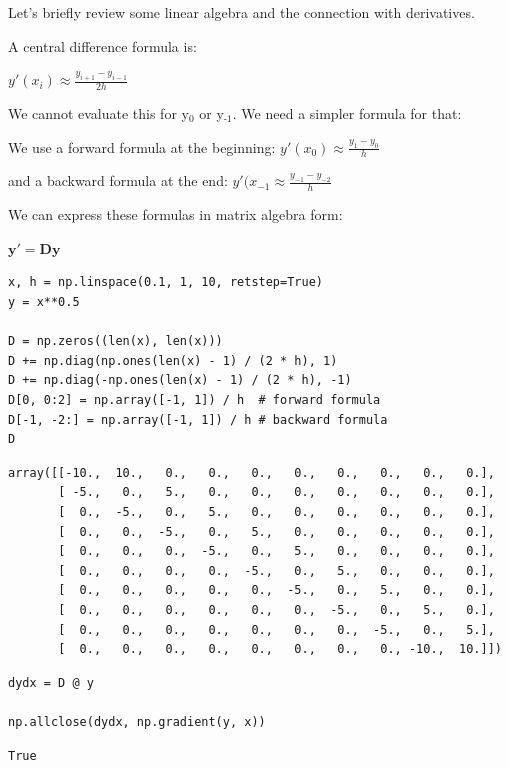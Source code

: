 \documentclass[11pt]{article}
\begin{document}
Let's briefly review some linear algebra and the connection with derivatives.

A central difference formula is:

\(y'(x_i) \approx \frac{y_{i+1} - y_{i-1}}{2h}\)

We cannot evaluate this for y\(_{\text{0}}\) or y\(_{\text{-1}}\). We need a simpler formula for that:

We use a forward formula at the beginning: \(y'(x_0) \approx \frac{y_1 - y_0}{h}\)

and a backward formula at the end:  \(y'(x_{-1} \approx \frac{y_{-1} - y_{-2}}{h}\)

We can express these formulas in matrix algebra form:

\(\mathbf{y'} = \mathbf{D} \mathbf{y}\)

\begin{verbatim}
x, h = np.linspace(0.1, 1, 10, retstep=True)
y = x**0.5

D = np.zeros((len(x), len(x)))
D += np.diag(np.ones(len(x) - 1) / (2 * h), 1)
D += np.diag(-np.ones(len(x) - 1) / (2 * h), -1)
D[0, 0:2] = np.array([-1, 1]) / h  # forward formula
D[-1, -2:] = np.array([-1, 1]) / h # backward formula
D
\end{verbatim}

\begin{verbatim}
array([[-10.,  10.,   0.,   0.,   0.,   0.,   0.,   0.,   0.,   0.],
       [ -5.,   0.,   5.,   0.,   0.,   0.,   0.,   0.,   0.,   0.],
       [  0.,  -5.,   0.,   5.,   0.,   0.,   0.,   0.,   0.,   0.],
       [  0.,   0.,  -5.,   0.,   5.,   0.,   0.,   0.,   0.,   0.],
       [  0.,   0.,   0.,  -5.,   0.,   5.,   0.,   0.,   0.,   0.],
       [  0.,   0.,   0.,   0.,  -5.,   0.,   5.,   0.,   0.,   0.],
       [  0.,   0.,   0.,   0.,   0.,  -5.,   0.,   5.,   0.,   0.],
       [  0.,   0.,   0.,   0.,   0.,   0.,  -5.,   0.,   5.,   0.],
       [  0.,   0.,   0.,   0.,   0.,   0.,   0.,  -5.,   0.,   5.],
       [  0.,   0.,   0.,   0.,   0.,   0.,   0.,   0., -10.,  10.]])
\end{verbatim}

\begin{verbatim}
dydx = D @ y

np.allclose(dydx, np.gradient(y, x))
\end{verbatim}

\begin{verbatim}
True
\end{verbatim}
\end{document}
